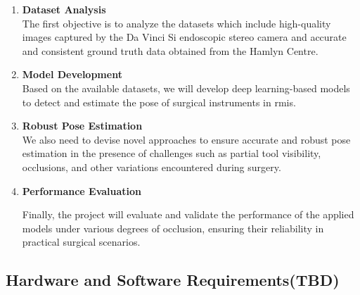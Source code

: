 \documentclass[12pt]{article}
\begin{document}
\begin{enumerate}

\item \textbf{Dataset Analysis}
\\The first objective is to analyze the datasets which include high-quality images captured by the Da Vinci Si endoscopic stereo camera and accurate and consistent ground truth data obtained from the Hamlyn Centre.

\item \textbf{Model Development}
\\Based on the available datasets, we will develop deep learning-based models to detect and estimate the pose of surgical instruments in \gls{rmis}.

\item \textbf{Robust Pose Estimation}
\\We also need to devise novel approaches to ensure accurate and robust pose estimation in the presence of challenges such as partial tool visibility, occlusions, and other variations encountered during surgery. 

\item \textbf{Performance Evaluation}

Finally, the project will evaluate and validate the performance of the applied models under various degrees of occlusion, ensuring their reliability in practical surgical scenarios.

\end{enumerate}


\subsection{Hardware and Software Requirements(TBD)}
\end{document}
